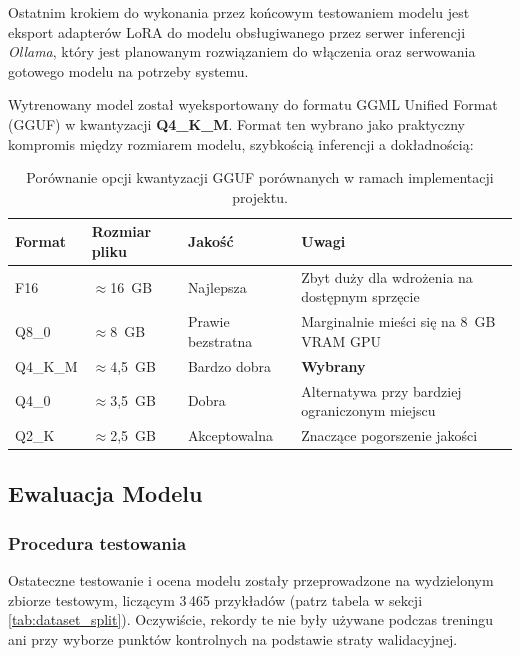 \documentclass[12pt,a4paper]{article}
\begin{document}
Ostatnim krokiem do wykonania przez końcowym testowaniem modelu jest eksport adapterów LoRA do modelu obsługiwanego przez serwer inferencji \emph{Ollama}, który 
jest planowanym rozwiązaniem do włączenia oraz serwowania gotowego modelu na potrzeby systemu.

Wytrenowany model został wyeksportowany do formatu GGML Unified Format (GGUF) w kwantyzacji \textbf{Q4\_K\_M}. Format ten wybrano jako praktyczny kompromis
między rozmiarem modelu, szybkością inferencji a dokładnością:

\begin{table}[H]
    \centering
    \begin{tabular}{lllp{5cm}}
        \toprule
        \textbf{Format} & \textbf{Rozmiar pliku} & \textbf{Jakość} & \textbf{Uwagi} \\
        \midrule
        F16      & $\approx$16~GB    & Najlepsza         & Zbyt duży dla wdrożenia na dostępnym sprzęcie \\
        Q8\_0    & $\approx$8~GB     & Prawie bezstratna & Marginalnie mieści się na 8~GB VRAM GPU \\
        Q4\_K\_M & $\approx$4{,}5~GB & Bardzo dobra    & \textbf{Wybrany} \\
        Q4\_0    & $\approx$3{,}5~GB & Dobra           & Alternatywa przy bardziej ograniczonym miejscu \\
        Q2\_K    & $\approx$2{,}5~GB & Akceptowalna    & Znaczące pogorszenie jakości \\
        \bottomrule
    \end{tabular}
    \caption{Porównanie opcji kwantyzacji GGUF porównanych w ramach implementacji projektu.}
\end{table}



\subsection{Ewaluacja Modelu}
\label{ssec:model_evaluation}

\subsubsection{Procedura testowania}

Ostateczne testowanie i ocena modelu zostały przeprowadzone na wydzielonym zbiorze testowym, liczącym 3\,465 przykładów (patrz tabela w sekcji \ref{tab:dataset_split}).
Oczywiście, rekordy te nie były używane podczas treningu ani przy wyborze punktów kontrolnych na podstawie straty walidacyjnej. 
\end{document}
